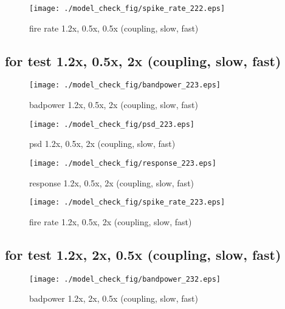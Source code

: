 \documentclass[11pt]{article}
\begin{document}
\begin{figure}[htbp]
\begin{center}
\texttt{[image: ./model\_check\_fig/spike\_rate\_222.eps]}
\caption{fire rate 1.2x, 0.5x, 0.5x (coupling, slow, fast)}
\end{center}
\end{figure}

\subsection{for test 1.2x, 0.5x, 2x (coupling, slow, fast)}
\label{sec:org223}

\begin{figure}[htbp]
\centering
\texttt{[image: ./model\_check\_fig/bandpower\_223.eps]}
\caption{badpower 1.2x, 0.5x, 2x (coupling, slow, fast)}
\end{figure}

\begin{figure}[htbp]
\begin{center}
\texttt{[image: ./model\_check\_fig/psd\_223.eps]}
\caption{psd 1.2x, 0.5x, 2x (coupling, slow, fast)}
\end{center}
\end{figure}

\begin{figure}[htbp]
\begin{center}
\texttt{[image: ./model\_check\_fig/response\_223.eps]}
\caption{response 1.2x, 0.5x, 2x (coupling, slow, fast)}
\end{center}
\end{figure}

\begin{figure}[htbp]
\begin{center}
\texttt{[image: ./model\_check\_fig/spike\_rate\_223.eps]}
\caption{fire rate 1.2x, 0.5x, 2x (coupling, slow, fast)}
\end{center}
\end{figure}


\subsection{for test 1.2x, 2x, 0.5x (coupling, slow, fast)}
\label{sec:org232}

\begin{figure}[htbp]
\centering
\texttt{[image: ./model\_check\_fig/bandpower\_232.eps]}
\caption{badpower 1.2x, 2x, 0.5x (coupling, slow, fast)}
\end{figure}
\end{document}
